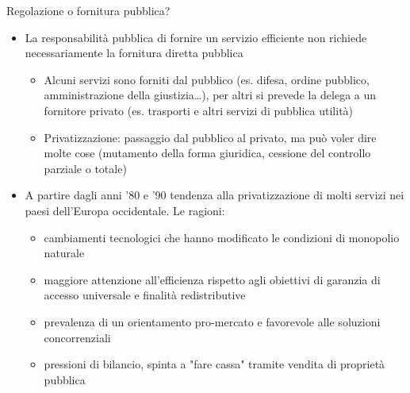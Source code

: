 \documentclass[aspectratio=64,11pt]{beamer}
\begin{document}
\begin{frame}{Regolazione o fornitura pubblica?}
\begin{itemize}
\item La responsabilità pubblica di fornire un servizio efficiente non richiede
necessariamente la fornitura diretta pubblica
\begin{itemize}
\item Alcuni servizi sono forniti dal pubblico (es. difesa, ordine pubblico,
amministrazione della giustizia\ldots{}), per altri si prevede la delega a un
fornitore privato (es. trasporti e altri servizi di pubblica utilità)
\item \alert{Privatizzazione}: passaggio dal pubblico al privato, ma può voler dire
molte cose (mutamento della forma giuridica, cessione del controllo
parziale o totale)
\end{itemize}
\item A partire dagli anni '80 e '90 tendenza alla privatizzazione di molti
servizi nei paesi dell'Europa occidentale. Le ragioni:
\begin{itemize}
\item cambiamenti tecnologici che hanno modificato le condizioni di monopolio
naturale
\item maggiore attenzione all'efficienza rispetto agli obiettivi di garanzia di
accesso universale e finalità redistributive
\item prevalenza di un orientamento pro-mercato e favorevole alle soluzioni
concorrenziali
\item pressioni di bilancio, spinta a "fare cassa" tramite vendita di proprietà
pubblica
\end{itemize}
\end{itemize}
\end{frame}
\end{document}
